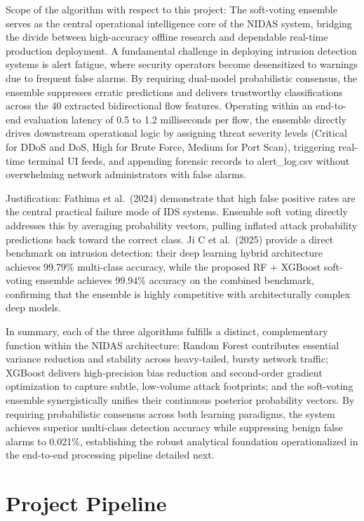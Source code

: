 \documentclass[12pt,a4paper]{report}
\begin{document}
Scope of the algorithm with respect to this project: The soft-voting ensemble serves as the central operational intelligence core of the NIDAS system, bridging the divide between high-accuracy offline research and dependable real-time production deployment. A fundamental challenge in deploying intrusion detection systems is alert fatigue, where security operators become desensitized to warnings due to frequent false alarms. By requiring dual-model probabilistic consensus, the ensemble suppresses erratic predictions and delivers trustworthy classifications across the 40 extracted bidirectional flow features. Operating within an end-to-end evaluation latency of 0.5 to 1.2 milliseconds per flow, the ensemble directly drives downstream operational logic by assigning threat severity levels (Critical for DDoS and DoS, High for Brute Force, Medium for Port Scan), triggering real-time terminal UI feeds, and appending forensic records to alert\_log.csv without overwhelming network administrators with false alarms.

Justification: Fathima et al.\ (2024) demonstrate that high false positive rates are the central practical failure mode of IDS systems. Ensemble soft voting directly addresses this by averaging probability vectors, pulling inflated attack probability predictions back toward the correct class. Ji C et al.\ (2025) provide a direct benchmark on intrusion detection: their deep learning hybrid architecture achieves 99.79\% multi-class accuracy, while the proposed RF + XGBoost soft-voting ensemble achieves 99.94\% accuracy on the combined benchmark, confirming that the ensemble is highly competitive with architecturally complex deep models.

In summary, each of the three algorithms fulfills a distinct, complementary function within the NIDAS architecture: Random Forest contributes essential variance reduction and stability across heavy-tailed, bursty network traffic; XGBoost delivers high-precision bias reduction and second-order gradient optimization to capture subtle, low-volume attack footprints; and the soft-voting ensemble synergistically unifies their continuous posterior probability vectors. By requiring probabilistic consensus across both learning paradigms, the system achieves superior multi-class detection accuracy while suppressing benign false alarms to 0.021\%, establishing the robust analytical foundation operationalized in the end-to-end processing pipeline detailed next.

\section{Project Pipeline}
\end{document}
